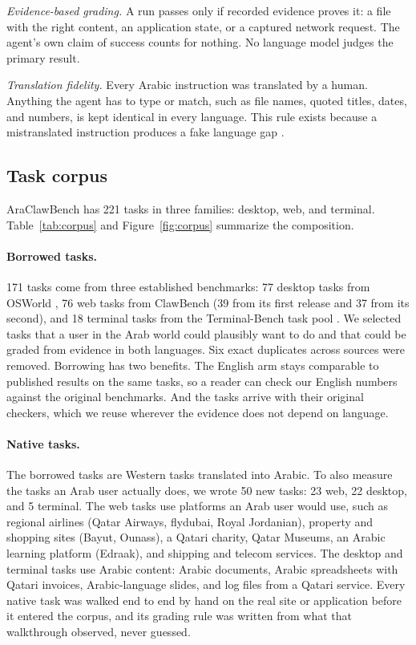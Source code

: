 \textit{Evidence-based grading.} A run passes only if recorded evidence proves
it: a file with the right content, an application state, or a captured network
request. The agent's own claim of success counts for nothing. No language model
judges the primary result.

\textit{Translation fidelity.} Every Arabic instruction was translated by a
human. Anything the agent has to type or match, such as file names, quoted
titles, dates, and numbers, is kept identical in every language. This rule
exists because a mistranslated instruction produces a fake language gap
\citep{kim2026lilt}.

\subsection{Task corpus}
\label{sec:corpus}

AraClawBench has 221 tasks in three families: desktop, web, and terminal.
Table~\ref{tab:corpus} and Figure~\ref{fig:corpus} summarize the composition.

\paragraph{Borrowed tasks.}
171 tasks come from three established benchmarks: 77 desktop tasks from
OSWorld \citep{xie2024osworld}, 76 web tasks from ClawBench
\citep{zhang2026clawbench} (39 from its first release and 37 from its second),
and 18 terminal tasks from the Terminal-Bench task pool
\citep{merrill2026terminalbench}. We selected tasks that a user in the Arab
world could plausibly want to do and that could be graded from evidence in
both languages. Six exact duplicates across sources were removed. Borrowing has
two benefits. The English arm stays comparable to published results on the
same tasks, so a reader can check our English numbers against the original
benchmarks. And the tasks arrive with their original checkers, which we reuse
wherever the evidence does not depend on language.

\paragraph{Native tasks.}
The borrowed tasks are Western tasks translated into Arabic. To also measure
the tasks an Arab user actually does, we wrote 50 new tasks: 23 web, 22
desktop, and 5 terminal. The web tasks use platforms an Arab user would use,
such as regional airlines (Qatar Airways, flydubai, Royal Jordanian), property
and shopping sites (Bayut, Ounass), a Qatari charity, Qatar Museums, an Arabic
learning platform (Edraak), and shipping and telecom services. The desktop and
terminal tasks use Arabic content: Arabic documents, Arabic spreadsheets with
Qatari invoices, Arabic-language slides, and log files from a Qatari service.
Every native task was walked end to end by hand on the real site or
application before it entered the corpus, and its grading rule was written
from what that walkthrough observed, never guessed.

